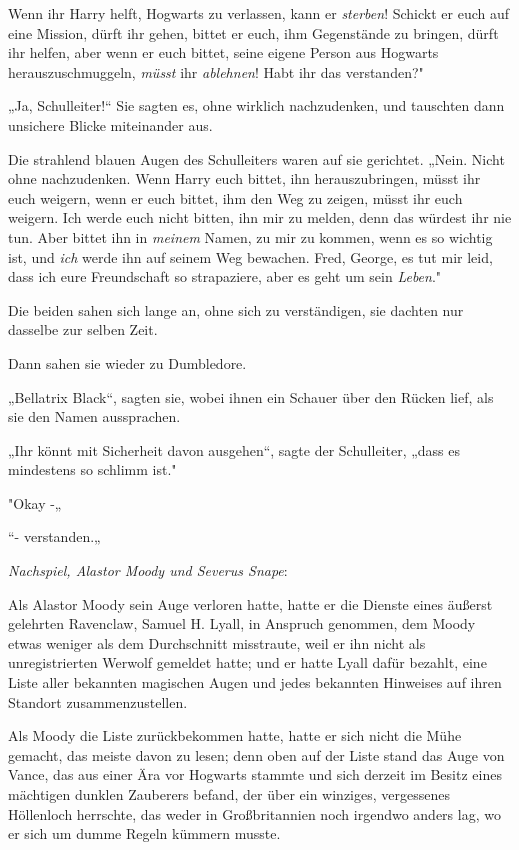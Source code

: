 {Wenn ihr Harry helft, Hogwarts zu verlassen, kann er \emph{sterben}! Schickt er euch auf eine Mission, dürft ihr gehen, bittet er euch, ihm Gegenstände zu bringen, dürft ihr helfen, aber wenn er euch bittet, seine eigene Person aus Hogwarts herauszuschmuggeln, \emph{müsst} ihr \emph{ablehnen}! Habt ihr das verstanden?"

„Ja, Schulleiter!“ Sie sagten es, ohne wirklich nachzudenken, und tauschten dann unsichere Blicke miteinander aus.

Die strahlend blauen Augen des Schulleiters waren auf sie gerichtet. „Nein. Nicht ohne nachzudenken. Wenn Harry euch bittet, ihn herauszubringen, müsst ihr euch weigern, wenn er euch bittet, ihm den Weg zu zeigen, müsst ihr euch weigern. Ich werde euch nicht bitten, ihn mir zu melden, denn das würdest ihr nie tun. Aber bittet ihn in \emph{meinem} Namen, zu mir zu kommen, wenn es so wichtig ist, und \emph{ich} werde ihn auf seinem Weg bewachen. Fred, George, es tut mir leid, dass ich eure Freundschaft so strapaziere, aber es geht um sein \emph{Leben}."

Die beiden sahen sich lange an, ohne sich zu verständigen, sie dachten nur dasselbe zur selben Zeit.

Dann sahen sie wieder zu Dumbledore.

„Bellatrix Black“, sagten sie, wobei ihnen ein Schauer über den Rücken lief, als sie den Namen aussprachen.

„Ihr könnt mit Sicherheit davon ausgehen“, sagte der Schulleiter, „dass es mindestens so schlimm ist."

"Okay -„

“- verstanden.„

\emph{Nachspiel, Alastor Moody und Severus Snape}:

Als Alastor Moody sein Auge verloren hatte, hatte er die Dienste eines äußerst gelehrten Ravenclaw, Samuel H. Lyall, in Anspruch genommen, dem Moody etwas weniger als dem Durchschnitt misstraute, weil er ihn nicht als unregistrierten Werwolf gemeldet hatte; und er hatte Lyall dafür bezahlt, eine Liste aller bekannten magischen Augen und jedes bekannten Hinweises auf ihren Standort zusammenzustellen.

Als Moody die Liste zurückbekommen hatte, hatte er sich nicht die Mühe gemacht, das meiste davon zu lesen; denn oben auf der Liste stand das Auge von Vance, das aus einer Ära vor Hogwarts stammte und sich derzeit im Besitz eines mächtigen dunklen Zauberers befand, der über ein winziges, vergessenes Höllenloch herrschte, das weder in Großbritannien noch irgendwo anders lag, wo er sich um dumme Regeln kümmern musste.

}
